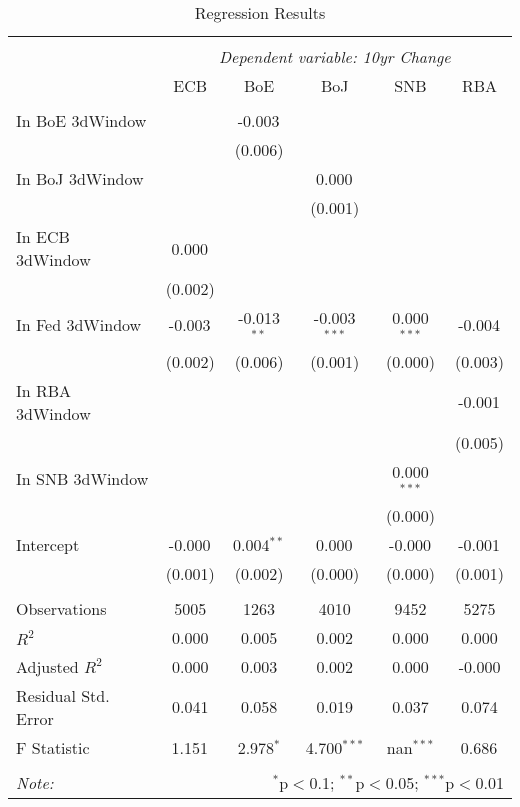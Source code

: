 \begin{table}[!htbp] \centering
  \caption{Regression Results}
\begin{tabular}{@{\extracolsep{5pt}}lccccc}
\\[-1.8ex]\hline
\hline \\[-1.8ex]
& \multicolumn{5}{c}{\textit{Dependent variable: 10yr Change}} \
\cr \cline{2-6}
\\[-1.8ex] & \multicolumn{1}{c}{ECB} & \multicolumn{1}{c}{BoE} & \multicolumn{1}{c}{BoJ} & \multicolumn{1}{c}{SNB} & \multicolumn{1}{c}{RBA}  \\
\hline \\[-1.8ex]
 In BoE 3dWindow & & -0.003$^{}$ & & & \\
& & (0.006) & & & \\
 In BoJ 3dWindow & & & 0.000$^{}$ & & \\
& & & (0.001) & & \\
 In ECB 3dWindow & 0.000$^{}$ & & & & \\
& (0.002) & & & & \\
 In Fed 3dWindow & -0.003$^{}$ & -0.013$^{**}$ & -0.003$^{***}$ & 0.000$^{***}$ & -0.004$^{}$ \\
& (0.002) & (0.006) & (0.001) & (0.000) & (0.003) \\
 In RBA 3dWindow & & & & & -0.001$^{}$ \\
& & & & & (0.005) \\
 In SNB 3dWindow & & & & 0.000$^{***}$ & \\
& & & & (0.000) & \\
 Intercept & -0.000$^{}$ & 0.004$^{**}$ & 0.000$^{}$ & -0.000$^{}$ & -0.001$^{}$ \\
& (0.001) & (0.002) & (0.000) & (0.000) & (0.001) \\
\hline \\[-1.8ex]
 Observations & 5005 & 1263 & 4010 & 9452 & 5275 \\
 $R^2$ & 0.000 & 0.005 & 0.002 & 0.000 & 0.000 \\
 Adjusted $R^2$ & 0.000 & 0.003 & 0.002 & 0.000 & -0.000 \\
 Residual Std. Error & 0.041 & 0.058 & 0.019 & 0.037 & 0.074 \\
 F Statistic & 1.151$^{}$ & 2.978$^{*}$ & 4.700$^{***}$ & nan$^{***}$ & 0.686$^{}$ \\
\hline
\hline \\[-1.8ex]
\textit{Note:} & \multicolumn{5}{r}{$^{*}$p$<$0.1; $^{**}$p$<$0.05; $^{***}$p$<$0.01} \\
\end{tabular}
\end{table}